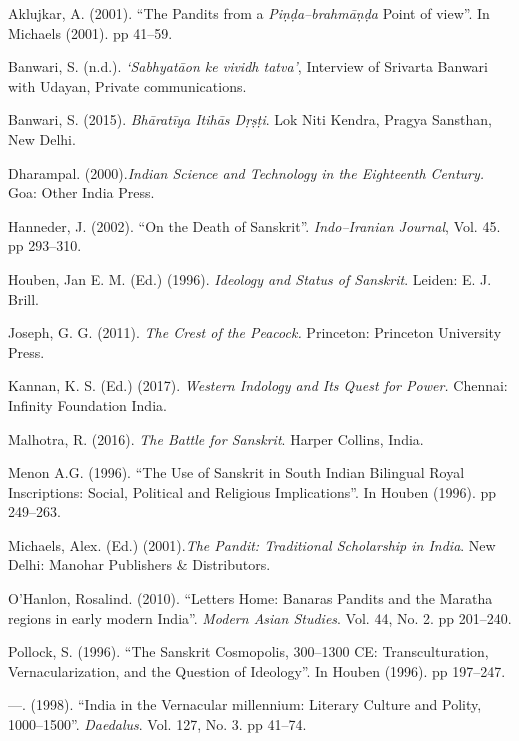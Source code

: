 \begin{thebibliography}{99}
\itemsep=1pt
 Aklujkar, A. (2001). “The Pandits from a \textit{Piṇḍa–brahmāṇḍa} Point of view”. In Michaels (2001). pp 41–59.

  Banwari, S. (n.d.). \textit{‘Sabhyatāon ke vividh tatva’}, Interview of Srivarta Banwari with Udayan, Private communications.

  Banwari, S. (2015). \textit{Bhāratīya Itihās Dṛṣṭi}. Lok Niti Kendra, Pragya Sansthan, New Delhi.

  Dharampal. (2000).\textit{Indian Science and Technology in the Eighteenth Century.} Goa: Other India Press.

  Hanneder, J. (2002). “On the Death of Sanskrit”. \textit{Indo–Iranian Journal}, Vol. 45. pp 293–310.

  Houben, Jan E. M. (Ed.) (1996). \textit{Ideology and Status of Sanskrit}. Leiden: E. J. Brill.

  Joseph, G. G. (2011). \textit{The Crest of the Peacock.} Princeton: Princeton University Press.

  Kannan, K. S. (Ed.) (2017). \textit{Western Indology and Its Quest for Power.} Chennai: Infinity Foundation India.

  Malhotra, R. (2016). \textit{The Battle for Sanskrit}. Harper Collins, India.

  Menon A.G. (1996). “The Use of Sanskrit in South Indian Bilingual Royal Inscriptions: Social, Political and Religious Implications”. In Houben (1996). pp 249–263.

  Michaels, Alex. (Ed.) (2001).\textit{The Pandit: Traditional Scholarship in India}. New Delhi: Manohar Publishers \& Distributors.

  O’Hanlon, Rosalind. (2010). “Letters Home: Banaras Pandits and the Maratha regions in early modern India”. \textit{Modern Asian Studies}. Vol. 44, No. 2. pp 201–240.

  Pollock, S. (1996). “The Sanskrit Cosmopolis, 300–1300 CE: Transculturation, Vernacularization, and the Question of Ideology”. In Houben (1996). pp 197–247.

  —. (1998). “India in the Vernacular millennium: Literary Culture and Polity, 1000–1500”. \textit{Daedalus}. Vol. 127, No. 3. pp 41–74.


\end{thebibliography}
